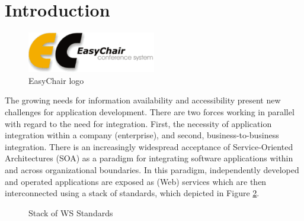 \documentclass[a4paper]{easychair}
\begin{document}
\setcounter{tocdepth}{2}
{\small
\tableofcontents}

%
%

\pagestyle{empty}


\section{Introduction}
\label{sect:introduction}

\begin{figure}[tb]
	\begin{centering}
	\includegraphics[width=0.5\textwidth]{logoEC}
	\caption{EasyChair logo}
	\label{fig:easychair-logo}
	\end{centering}
\end{figure}

The growing needs for information availability and accessibility present new challenges for application development. There are two forces working in parallel with regard to the need for integration. First, the necessity of application integration within a company (enterprise), and second, business-to-business integration. There is an increasingly widespread acceptance of Service-Oriented Architectures (SOA) as a paradigm for integrating software applications within and across organizational boundaries. In this paradigm, independently developed and operated applications are exposed as (Web) services which are then 
interconnected using a stack of standards, which depicted in Figure \ref{fig:soa-stack}. 
		
		\begin{figure}[ht]
		\begin{centering}
		\caption{Stack of WS Standards}
		\label{fig:soa-stack}
		\end{centering}
		\end{figure}
		
\end{document}
